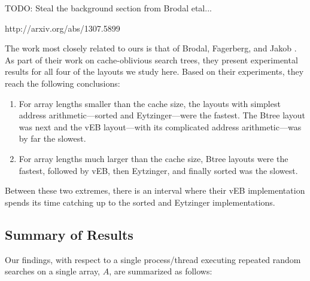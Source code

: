 \documentclass{patmorin}
\begin{document}
TODO: Steal the background section from Brodal etal...

http://arxiv.org/abs/1307.5899

The work most closely related to ours is that of Brodal, Fagerberg,
and Jakob \cite{brodal.fagerberg.ea:cache}. As part of their work on
cache-oblivious search trees, they present experimental results for
all four of the layouts we study here.  Based on their experiments,
they reach the following conclusions:

\begin{enumerate}

\item For array lengths smaller than the cache size, the layouts with
simplest address arithmetic---sorted and Eytzinger---were the fastest. The
Btree layout was next and the vEB layout---with its complicated address
arithmetic---was by far the slowest.

\item For array lengths much larger than the cache size, Btree layouts
were the fastest, followed by vEB, then Eytzinger, and finally sorted
was the slowest.
\end{enumerate}

Between these two extremes, there is an interval where their vEB
implementation spends its time catching up to the sorted and Eytzinger
implementations.


\subsection{Summary of Results}

Our findings, with respect to a single process/thread executing repeated
random searches on a single array, $A$, are summarized as follows:
\end{document}
